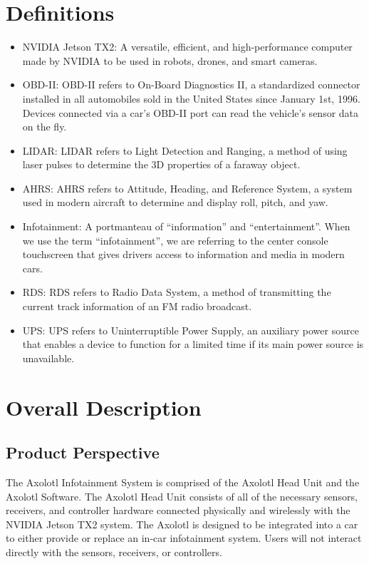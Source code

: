\documentclass[onecolumn, draftclsnofoot,10pt, compsoc]{IEEEtran}
\begin{document}
\section{Definitions}
\begin{itemize}
	\item NVIDIA Jetson TX2: A versatile, efficient, and high-performance computer made by NVIDIA to be used in robots, drones, and smart cameras.

	\item OBD-II: OBD-II refers to On-Board Diagnostics II, a standardized connector installed in all automobiles sold in the United States since January 1st, 1996. Devices connected via a car’s OBD-II port can read the vehicle’s sensor data on the fly.

	\item LIDAR: LIDAR refers to Light Detection and Ranging, a method of using laser pulses to determine the 3D properties of a faraway object.

	\item AHRS: AHRS refers to Attitude, Heading, and Reference System, a system used in modern aircraft to determine and display roll, pitch, and yaw.

	\item Infotainment: A portmanteau of “information” and “entertainment”. When we use the term “infotainment”, we are referring to the center console touchscreen that gives drivers access to information and media in modern cars.

	\item RDS: RDS refers to Radio Data System, a method of transmitting the current track information of an FM radio broadcast.

	\item UPS: UPS refers to Uninterruptible Power Supply, an auxiliary power source that enables a device to function for a limited time if its main power source is unavailable.

\end{itemize}

\section{Overall Description}
\subsection{Product Perspective}
The Axolotl Infotainment System is comprised of the Axolotl Head Unit and the Axolotl Software.
The Axolotl Head Unit consists of all of the necessary sensors, receivers, and controller hardware connected physically and wirelessly with the NVIDIA Jetson TX2 system. The Axolotl is designed to be integrated into a car to either provide or replace an in-car infotainment system. Users will not interact directly with the sensors, receivers, or controllers.\par
\end{document}
